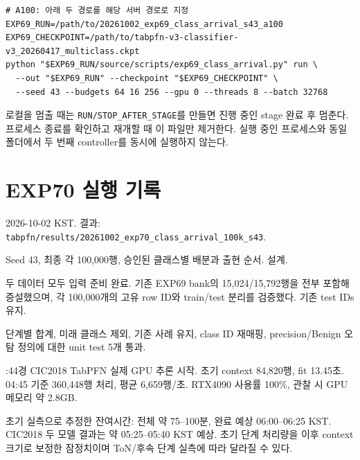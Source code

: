 \begin{Verbatim}[breaklines=true,breakanywhere=true,fontsize=\scriptsize]
# A100: 아래 두 경로를 해당 서버 경로로 지정
EXP69_RUN=/path/to/20261002_exp69_class_arrival_s43_a100
EXP69_CHECKPOINT=/path/to/tabpfn-v3-classifier-v3_20260417_multiclass.ckpt
python "$EXP69_RUN/source/scripts/exp69_class_arrival.py" run \
  --out "$EXP69_RUN" --checkpoint "$EXP69_CHECKPOINT" \
  --seed 43 --budgets 64 16 256 --gpu 0 --threads 8 --batch 32768

\end{Verbatim}
로컬을 멈출 때는 \texttt{RUN/\allowbreak{}\allowbreak{}STOP\allowbreak{}\_\allowbreak{}\allowbreak{}AFTER\_\allowbreak{}\allowbreak{}S\allowbreak{}TAGE}를 만들면 진행 중인 stage 완료 후 멈춘다. 프로세스 종료를 확인하고 재개할 때 이 파일만 제거한다. 실행 중인 프로세스와 동일 폴더에서 두 번째 controller를 동시에 실행하지 않는다.



\section{EXP70 실행 기록}
2026-10-02 KST. 결과: \texttt{tabpfn/\allowbreak{}\allowbreak{}r\allowbreak{}esults/\allowbreak{}\allowbreak{}2\allowbreak{}0261002\_\allowbreak{}\allowbreak{}exp70\_\allowbreak{}\allowbreak{}cl\allowbreak{}ass\_\allowbreak{}\allowbreak{}arri\allowbreak{}val\_\allowbreak{}\allowbreak{}100k\allowbreak{}\_\allowbreak{}\allowbreak{}s43}.

\par\noindent \textbullet\enspace Seed 43, 최종 각 100,000행, 승인된 클래스별 배분과 출현 순서. 설계.


\par\noindent \textbullet\enspace 두 데이터 모두 입력 준비 완료. 기존 EXP69 bank의 15,024/\allowbreak{}15,792행을 전부 포함해 증설했으며, 각 100,000개의 고유 row ID와 train/\allowbreak{}test 분리를 검증했다. 기존 test IDs 유지.


\par\noindent \textbullet\enspace 단계별 합계, 미래 클래스 제외, 기존 사례 유지, class ID 재매핑, precision/\allowbreak{}Benign 오탐 정의에 대한 unit test 5개 통과.


\par\noindent \textbullet{}:44경 CIC2018 TabPFN 실제 GPU 추론 시작. 초기 context 84,820행, fit 13.45초. 04:45 기준 360,448행 처리, 평균 6,659행/\allowbreak{}초. RTX4090 사용률 100\%, 관찰 시 GPU 메모리 약 2.8GB.


\par\noindent \textbullet\enspace 초기 실측으로 추정한 잔여시간: 전체 약 75–100분, 완료 예상 06:00–06:25 KST. CIC2018 두 모델 결과는 약 05:25–05:40 KST 예상. 초기 단계 처리량을 이후 context 크기로 보정한 잠정치이며 ToN/\allowbreak{}후속 단계 실측에 따라 달라질 수 있다.



